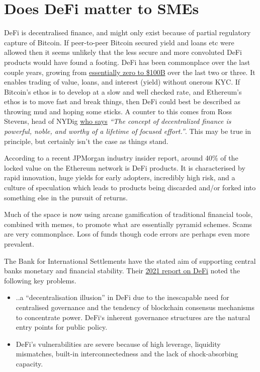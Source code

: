 \section{Does DeFi matter to SMEs }
DeFi is decentralised finance, and might only exist because of partial regulatory capture of Bitcoin. If peer-to-peer Bitcoin secured yield and loans etc were allowed then it seems unlikely that the less secure and more convoluted DeFi products would have found a footing. DeFi  has been commonplace over the last couple years, growing from \href{https://a16zcrypto.com/state-of-crypto-report-a16z-2022/}{essentially zero to \$100B} over the last two or three. It enables trading of value, loans, and interest (yield) without onerous KYC. If Bitcoin's ethos is to develop at a slow and well checked rate, and Ethereum's ethos is to move fast and break things, then DeFi could best be described as throwing mud and hoping some sticks. A counter to this comes from Ross Stevens, head of NYDig \href{https://nydig.com/on-impossible-things-before-breakfast}{who says} \textit{``The concept of decentralized finance is powerful, noble, and worthy of a lifetime of focused effort.''}. This may be true in principle, but certainly isn't the case as things stand.\par
According to a recent JPMorgan industry insider report, around 40\% of the locked value on the Ethereum network is DeFi products. It is characterised by rapid innovation, huge yields for early adopters, incredibly high risk, and a culture of speculation which leads to products being discarded and/or forked into something else in the pursuit of returns.\par 
Much of the space is now using arcane gamification of traditional financial tools, combined with memes, to promote what are essentially pyramid schemes. Scams are very commonplace. Loss of funds though code errors are perhaps even more prevalent.\par
The Bank for International Settlements have the stated aim of supporting central banks monetary and financial stability. Their \href{https://www.bis.org/publ/qtrpdf/r_qt2112b.pdf}{2021 report on DeFi} noted the following key problems.
\begin{itemize}
\item ..a ``decentralisation illusion'' in DeFi due to the inescapable need for centralised governance and the tendency of blockchain consensus mechanisms to concentrate power. DeFi`s inherent governance structures are the natural entry points for public policy.
\item DeFi’s vulnerabilities are severe because of high leverage, liquidity mismatches, built-in interconnectedness and the lack of shock-absorbing capacity.
\end{itemize}
